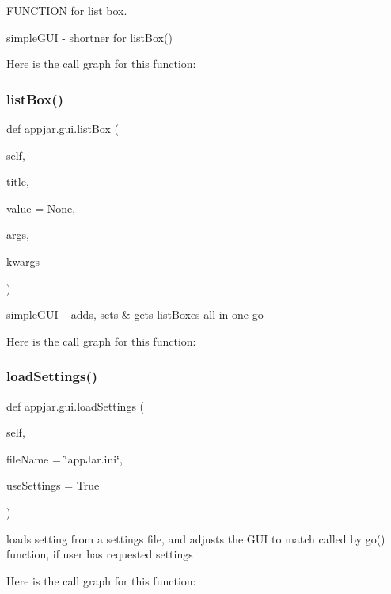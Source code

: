 F\+U\+N\+C\+T\+I\+ON for list box. 

\begin{DoxyVerb}simpleGUI - shortner for listBox() \end{DoxyVerb}
 Here is the call graph for this function\+:
\mbox{\label{classappjar_1_1gui_a22acd279d0497dafc7c0e0619ccc4d89}} 
\subsubsection{\texorpdfstring{list\+Box()}{listBox()}}
{\footnotesize\ttfamily def appjar.\+gui.\+list\+Box (\begin{DoxyParamCaption}\item[{}]{self,  }\item[{}]{title,  }\item[{}]{value = {\ttfamily None},  }\item[{}]{args,  }\item[{}]{kwargs }\end{DoxyParamCaption})}

\begin{DoxyVerb}simpleGUI -- adds, sets & gets listBoxes all in one go \end{DoxyVerb}
 Here is the call graph for this function\+:
\mbox{\label{classappjar_1_1gui_af2ee0abe3052301e3cbde9889d539e26}} 
\subsubsection{\texorpdfstring{load\+Settings()}{loadSettings()}}
{\footnotesize\ttfamily def appjar.\+gui.\+load\+Settings (\begin{DoxyParamCaption}\item[{}]{self,  }\item[{}]{file\+Name = {\ttfamily \char`\"{}appJar.ini\char`\"{}},  }\item[{}]{use\+Settings = {\ttfamily True} }\end{DoxyParamCaption})}

\begin{DoxyVerb}loads setting from a settings file, and adjusts the GUI to match
    called by go() function, if user has requested settings \end{DoxyVerb}
 Here is the call graph for this function\+:
\mbox{\label{classappjar_1_1gui_a34ac33d28f24372e8aa175baa7907acb}} 
